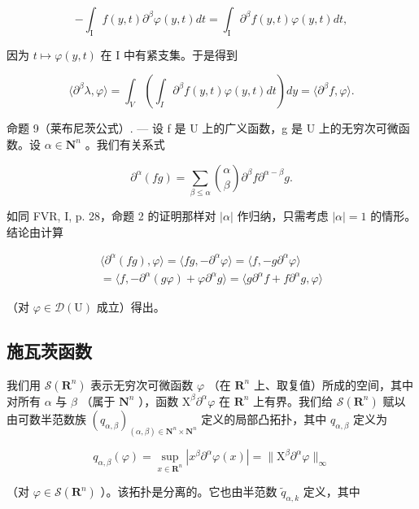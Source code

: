 \[
- \int_ {\mathrm{I}} f (y, t) \partial^ {\beta} \varphi (y, t) d t = \int_ {\mathrm{I}} \partial^ {\beta} f (y, t) \varphi (y, t) d t,
\]

因为 \(t \mapsto \varphi(y, t)\) 在 I 中有紧支集。于是得到

\[
\langle \partial^ {\beta} \lambda , \varphi \rangle = \int_ {V} \left(\int_ {I} \partial^ {\beta} f (y, t) \varphi (y, t) d t\right) d y = \langle \partial^ {\beta} f, \varphi \rangle .
\]

命题 9（莱布尼茨公式）. --- 设 f 是 U 上的广义函数，g 是 U 上的无穷次可微函数。设 \(\alpha \in \mathbf{N}^n\) 。我们有关系式

\[
\partial^ {\alpha} (f g) = \sum_ {\beta \leqslant \alpha} \binom {\alpha} {\beta} \partial^ {\beta} f   \partial^ {\alpha - \beta} g.
\]

如同 FVR, I, p. 28，命题 2 的证明那样对 \(|\alpha|\) 作归纳，只需考虑 \(|\alpha|=1\) 的情形。结论由计算

\[
\begin{array}{c} \langle \partial^ {\alpha} (f g), \varphi \rangle = \langle f g, - \partial^ {\alpha} \varphi \rangle = \langle f, - g \partial^ {\alpha} \varphi \rangle \\ = \langle f, - \partial^ {\alpha} (g \varphi) + \varphi \partial^ {\alpha} g \rangle = \langle g \partial^ {\alpha} f + f \partial^ {\alpha} g, \varphi \rangle \end{array}
\]

（对 \(\varphi\in\mathcal{D}(\mathrm{U})\) 成立）得出。

\subsection{施瓦茨函数}

我们用 \(\mathcal{S}(\mathbf{R}^{n})\) 表示无穷次可微函数 \(\varphi\) （在 \(\mathbf{R}^{n}\) 上、取复值）所成的空间，其中对所有 \(\alpha\) 与 \(\beta\) （属于 \(\mathbf{N}^{n}\) ），函数 \(\mathrm{X}^{\beta}\partial^{\alpha}\varphi\) 在 \(\mathbf{R}^{n}\) 上有界。我们给 \(\mathcal{S}(\mathbf{R}^{n})\) 赋以由可数半范数族 \((q_{\alpha,\beta})_{(\alpha,\beta)\in\mathbf{N}^{n}\times\mathbf{N}^{n}}\) 定义的局部凸拓扑，其中 \(q_{\alpha,\beta}\) 定义为

\[
q _ {\alpha , \beta} (\varphi) = \sup _ {x \in \mathbf {R} ^ {n}} | x ^ {\beta} \partial^ {\alpha} \varphi (x) | = \| \mathrm{X} ^ {\beta} \partial^ {\alpha} \varphi \| _ {\infty}
\]

（对 \(\varphi\in\mathcal{S}(\mathbf{R}^{n})\) ）。该拓扑是分离的。它也由半范数 \(\widetilde{q}_{\alpha,k}\) 定义，其中

